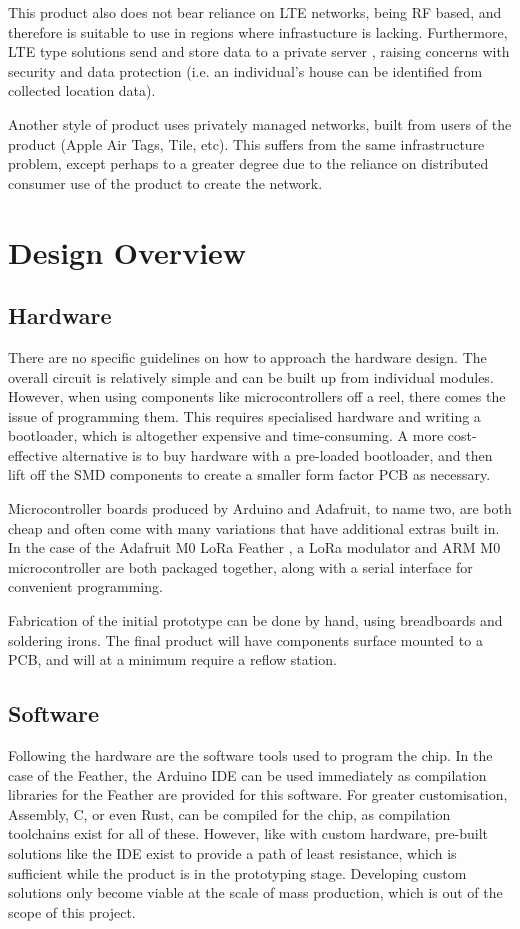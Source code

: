 \documentclass[11pt]{article}
\begin{document}
This product also does not bear reliance on LTE networks, being RF based, and therefore is suitable to use in regions where infrastucture is lacking.
Furthermore, LTE type solutions send and store data to a private server \cite{tractive:privacy}, raising concerns with security and data protection (i.e. an individual's house can be identified from collected location data).

Another style of product uses privately managed networks, built from users of the product (Apple Air Tags, Tile, etc).
This suffers from the same infrastructure problem, except perhaps to a greater degree due to the reliance on distributed consumer use of the product to create the network.

 
\section{Design Overview}

\subsection{Hardware}

There are no specific guidelines on how to approach the hardware design.
The overall circuit is relatively simple and can be built up from individual modules.
However, when using components like microcontrollers off a reel, there comes the issue of programming them.
This requires specialised hardware and writing a bootloader, which is altogether expensive and time-consuming. 
A more cost-effective alternative is to buy hardware with a pre-loaded bootloader, and then lift off the SMD components to create a smaller form factor PCB as necessary.

Microcontroller boards produced by Arduino and Adafruit, to name two, are both cheap and often come with many variations that have additional extras built in.
In the case of the Adafruit M0 LoRa Feather \cite{adafruit:loram0}, a LoRa modulator and ARM M0 microcontroller are both packaged together, along with a serial interface for convenient programming. 

Fabrication of the initial prototype can be done by hand, using breadboards and soldering irons. The final product will have components surface mounted to a PCB, and will at a minimum require a reflow station.

\subsection{Software}
Following the hardware are the software tools used to program the chip. In the case of the Feather, the Arduino IDE \cite{arduino:ide} can be used immediately as compilation libraries for the Feather are provided for this software.
For greater customisation, Assembly, C, or even Rust, can be compiled for the chip, as compilation toolchains exist for all of these. 
However, like with custom hardware, pre-built solutions like the IDE exist to provide a path of least resistance, which is sufficient while the product is in the prototyping stage. 
Developing custom solutions only become viable at the scale of mass production, which is out of the scope of this project. 
\end{document}
